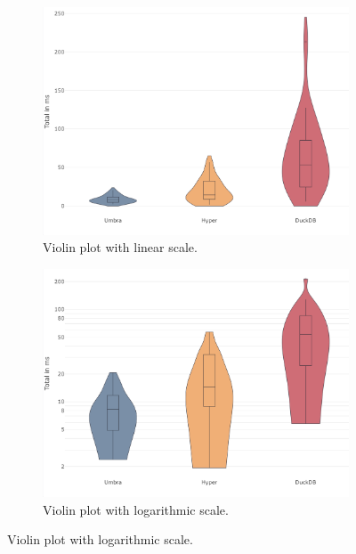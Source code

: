 \begin{figure}[h]
  \centering
  \begin{subfigure}[b]{0.3\linewidth}
    \includegraphics[width=\linewidth]{figures/scale-linear.png}
    \caption{Violin plot with linear scale.}
      \label{fig:scale-linear}
  \end{subfigure}
  \hspace{0.5cm} %
  \begin{subfigure}[b]{0.3\linewidth}
    \includegraphics[width=\linewidth]{figures/scale-log.png}
    \caption{Violin plot with logarithmic scale.}
      \label{fig:scale-log}
  \end{subfigure}
  \hspace{0.5cm} %

\end{figure}
